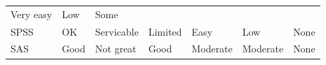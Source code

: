 \documentclass[
]{book}
\begin{document}
\begin{longtable}[]{@{}lllllll@{}}
\begin{minipage}[t]{0.11\columnwidth}
Very easy\strut
\end{minipage} & \begin{minipage}[t]{0.17\columnwidth}\raggedright
Low\strut
\end{minipage} & \begin{minipage}[t]{0.05\columnwidth}\raggedright
Some\strut
\end{minipage}\tabularnewline
\begin{minipage}[t]{0.08\columnwidth}\raggedright
SPSS\strut
\end{minipage} & \begin{minipage}[t]{0.10\columnwidth}\raggedright
OK\strut
\end{minipage} & \begin{minipage}[t]{0.13\columnwidth}\raggedright
Servicable\strut
\end{minipage} & \begin{minipage}[t]{0.16\columnwidth}\raggedright
Limited\strut
\end{minipage} & \begin{minipage}[t]{0.11\columnwidth}\raggedright
Easy\strut
\end{minipage} & \begin{minipage}[t]{0.17\columnwidth}\raggedright
Low\strut
\end{minipage} & \begin{minipage}[t]{0.05\columnwidth}\raggedright
None\strut
\end{minipage}\tabularnewline
\begin{minipage}[t]{0.08\columnwidth}\raggedright
SAS\strut
\end{minipage} & \begin{minipage}[t]{0.10\columnwidth}\raggedright
Good\strut
\end{minipage} & \begin{minipage}[t]{0.13\columnwidth}\raggedright
Not great\strut
\end{minipage} & \begin{minipage}[t]{0.16\columnwidth}\raggedright
Good\strut
\end{minipage} & \begin{minipage}[t]{0.11\columnwidth}\raggedright
Moderate\strut
\end{minipage} & \begin{minipage}[t]{0.17\columnwidth}\raggedright
Moderate\strut
\end{minipage} & \begin{minipage}[t]{0.05\columnwidth}\raggedright
None\strut
\end{minipage}\tabularnewline

\end{longtable}
\end{document}
